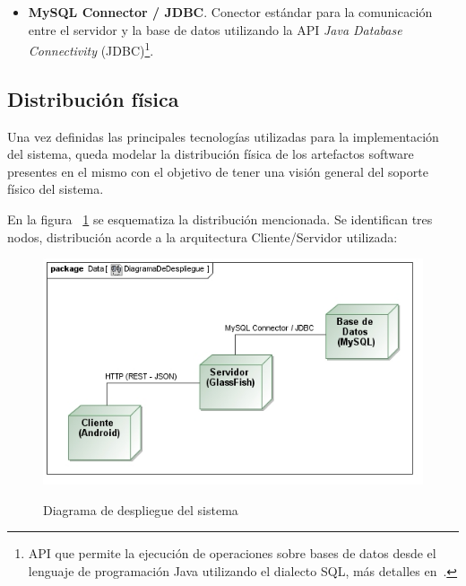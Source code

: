 \begin{itemize}
	\item{\textbf{MySQL Connector / JDBC}. Conector estándar para la comunicación entre el servidor y la base de datos utilizando la API \emph{Java Database Connectivity} (JDBC)\footnote{API que permite la ejecución de operaciones sobre bases de datos desde el lenguaje de programación Java utilizando el dialecto SQL, más detalles en~\cite{OraDB}.}.}

\end{itemize}

\subsection{Distribución física}

Una vez definidas las principales tecnologías utilizadas para la implementación del sistema, queda modelar la distribución física de los artefactos software presentes en el mismo con el objetivo de tener una visión general del soporte físico del sistema.

En la figura ~\ref{fig:diagramaDespliegue} se esquematiza la distribución mencionada. Se identifican tres nodos, distribución acorde a la arquitectura Cliente/Servidor utilizada:

\begin{figure}
	\centering
	{\includegraphics[width=\linewidth,height=\textheight,keepaspectratio]{Images/Diagramas/09_DiagramaDeDespliegue}}
	\caption{Diagrama de despliegue del sistema}
	\label{fig:diagramaDespliegue}
\end{figure}

